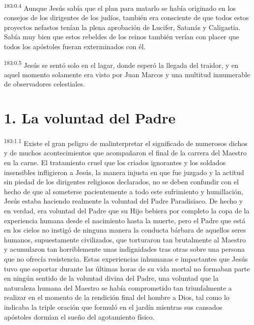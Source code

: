 \par 
\textsuperscript{183:0.4} Aunque Jesús sabía que el plan para matarlo se había originado en los consejos de los dirigentes de los judíos, también era consciente de que todos estos proyectos nefastos tenían la plena aprobación de Lucifer, Satanás y Caligastia. Sabía muy bien que estos rebeldes de los reinos también verían con placer que todos los apóstoles fueran exterminados con él.

\par 
\textsuperscript{183:0.5} Jesús se sentó solo en el lagar, donde esperó la llegada del traidor, y en aquel momento solamente era visto por Juan Marcos y una multitud innumerable de observadores celestiales.

\section*{1. La voluntad del Padre}
\par 
\textsuperscript{183:1.1} Existe el gran peligro de malinterpretar el significado de numerosos dichos y de muchos acontecimientos que acompañaron el final de la carrera del Maestro en la carne. El tratamiento cruel que los criados ignorantes y los soldados insensibles infligieron a Jesús, la manera injusta en que fue juzgado y la actitud sin piedad de los dirigentes religiosos declarados, no se deben confundir con el hecho de que al someterse pacientemente a todo este sufrimiento y humillación, Jesús estaba haciendo realmente la voluntad del Padre Paradisiaco. De hecho y en verdad, era voluntad del Padre que su Hijo bebiera por completo la copa de la experiencia humana desde el nacimiento hasta la muerte, pero el Padre que está en los cielos no instigó de ninguna manera la conducta bárbara de aquellos seres humanos, supuestamente civilizados, que torturaron tan brutalmente al Maestro y acumularon tan horriblemente unas indignidades tras otras sobre una persona que no ofrecía resistencia. Estas experiencias inhumanas e impactantes que Jesús tuvo que soportar durante las últimas horas de su vida mortal no formaban parte en ningún sentido de la voluntad divina del Padre, una voluntad que la naturaleza humana del Maestro se había comprometido tan triunfalmente a realizar en el momento de la rendición final del hombre a Dios, tal como lo indicaba la triple oración que formuló en el jardín mientras sus cansados apóstoles dormían el sueño del agotamiento físico.

